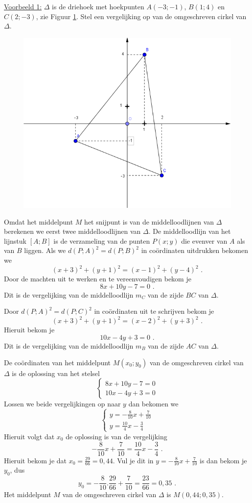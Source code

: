 \noindent \underline{Voorbeeld 1:} $\Delta$ is de driehoek met hoekpunten $A(-3;-1)$, $B(1;4)$ en $C(2;-3)$, zie Figuur \ref{fig4.2.15_fig2}.
Stel een vergelijking op van de omgeschreven cirkel van $\Delta$.
\begin{figure}[h]
\begin{center}
\includegraphics[width=.5\linewidth]{4_opp_inhoud_an_meetk/inputs/AMTekst7Fig2}
\caption{}
\label{fig4.2.15_fig2}
\end{center}
\end{figure}

Omdat het middelpunt $M$ het snijpunt is van de middelloodlijnen van $\Delta$ berekenen we eerst twee middelloodlijnen van $\Delta$.
De middelloodlijn van het lijnstuk $[A;B]$ is de verzameling van de punten $P(x;y)$ die evenver van $A$ als van $B$ liggen.
Als we $d(P;A)^2=d(P;B)^2$ in co\"ordinaten uitdrukken bekomen we
\[
(x+3)^2+(y+1)^2=(x-1)^2+(y-4)^2 \text { .}
\]
Door de machten uit te werken en te vereenvoudigen bekom je
\[
8x+10y-7=0 \text { .}
\]
Dit is de vergelijking van de middelloodlijn $m_C$ van de zijde $BC$ van $\Delta$.

Door $d(P;A)^2=d(P;C)^2$ in co\"ordinaten uit te schrijven bekom je
\[
(x+3)^2+(y+1)^2=(x-2)^2+(y+3)^2 \text { .}
\]
Hieruit bekom je
\[
10x-4y+3=0 \text { .}
\]
Dit is de vergelijking van de middelloodlijn $m_B$ van de zijde $AC$ van $\Delta$.

De co\"ordinaten van het middelpunt $M(x_0;y_0)$ van de omgeschreven cirkel van $\Delta$ is de oplossing van het stelsel
\[
\begin{cases}
8x+10y-7=0\\
10x-4y+3=0
\end{cases}
\]
Lossen we beide vergelijkingen op naar $y$ dan bekomen we
\[
\begin{cases}
y=-\frac {8}{10}x+\frac {7}{10}\\
y=\frac {10}{4}x-\frac {3}{4}
\end{cases}
\]
Hieruit volgt dat $x_0$ de oplossing is van de vergelijking
\[
-\frac {8}{10}x+\frac {7}{10}=\frac {10}{4}x-\frac {3}{4} \text { .}
\]
Hieruit bekom je dat $x_0=\frac {29}{66}=0,44$.
Vul je dit in $y=-\frac {8}{10}x+\frac {7}{10}$ is dan bekom je $y_0$, dus
\[
y_0=-\frac {8}{10}.\frac {29}{66}+\frac {7}{10}=\frac {23}{66}=0,35 \text { .}
\]
Het middelpunt $M$ van de omgeschreven cirkel van $\Delta$ is $M(0,44;0,35)$.

